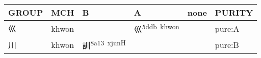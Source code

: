 \documentclass[14pt,a4paper]{scrartcl}
\begin{document}
\begin{longtable}[c]{@{}llllll@{}}
\toprule
\begin{minipage}[b]{0.14\columnwidth}\raggedright\strut
GROUP
\strut\end{minipage} &
\begin{minipage}[b]{0.14\columnwidth}\raggedright\strut
MCH
\strut\end{minipage} &
\begin{minipage}[b]{0.14\columnwidth}\raggedright\strut
B
\strut\end{minipage} &
\begin{minipage}[b]{0.14\columnwidth}\raggedright\strut
A
\strut\end{minipage} &
\begin{minipage}[b]{0.14\columnwidth}\raggedright\strut
none
\strut\end{minipage} &
\begin{minipage}[b]{0.14\columnwidth}\raggedright\strut
PURITY
\strut\end{minipage}\tabularnewline
\midrule
\endhead
\begin{minipage}[t]{0.14\columnwidth}\raggedright\strut
巛
\strut\end{minipage} &
\begin{minipage}[t]{0.14\columnwidth}\raggedright\strut
khwon
\strut\end{minipage} &
\begin{minipage}[t]{0.14\columnwidth}\raggedright\strut
\strut\end{minipage} &
\begin{minipage}[t]{0.14\columnwidth}\raggedright\strut
巛\textsuperscript{5ddb~khwon}
\strut\end{minipage} &
\begin{minipage}[t]{0.14\columnwidth}\raggedright\strut
\strut\end{minipage} &
\begin{minipage}[t]{0.14\columnwidth}\raggedright\strut
pure:A
\strut\end{minipage}\tabularnewline
\begin{minipage}[t]{0.14\columnwidth}\raggedright\strut
川
\strut\end{minipage} &
\begin{minipage}[t]{0.14\columnwidth}\raggedright\strut
khwon
\strut\end{minipage} &
\begin{minipage}[t]{0.14\columnwidth}\raggedright\strut
訓\textsuperscript{8a13~xjunH}
\strut\end{minipage} &
\begin{minipage}[t]{0.14\columnwidth}\raggedright\strut
\strut\end{minipage} &
\begin{minipage}[t]{0.14\columnwidth}\raggedright\strut
\strut\end{minipage} &
\begin{minipage}[t]{0.14\columnwidth}\raggedright\strut
pure:B
\strut\end{minipage}\tabularnewline
\bottomrule
\end{longtable}
\end{document}
